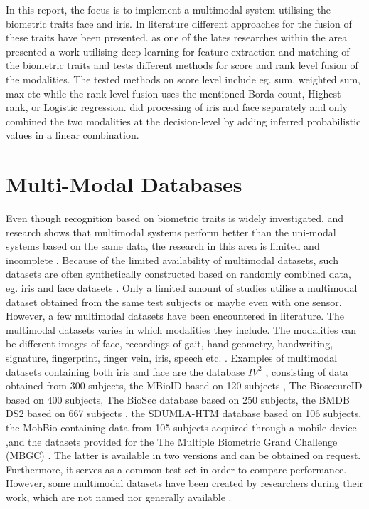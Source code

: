 In this report, the focus is to implement a multimodal system utilising the biometric traits face and iris. In literature different approaches for the fusion of these traits have been presented. \cite{Al-Waisy2017a} as one of the lates researches within the area presented a work utilising deep learning for feature extraction and matching of the biometric traits and tests different methods for score and rank level fusion of the modalities. The tested methods on score level include eg.  sum, weighted sum, max etc while the rank level fusion uses the mentioned Borda count, Highest rank, or Logistic regression. \cite{Chen2005a} did processing of iris and face separately and only combined the two modalities at the decision-level by adding inferred probabilistic values in a linear combination.   

\section{Multi-Modal Databases}
\label{sec:multi_modal_data}
Even though recognition based on biometric traits is widely investigated, and research shows that multimodal systems perform better than the uni-modal systems based on the same data, the research in this area is limited and incomplete \citep{Chen2005a,Bowyer2016b}. Because of the limited availability of multimodal datasets, such datasets are often synthetically constructed based on randomly combined data, eg. iris and face datasets \citep{Chen2005a}. Only a limited amount of studies  utilise a multimodal dataset obtained from the same test subjects or maybe even with one sensor. However, a few multimodal datasets have been encountered in literature. The multimodal datasets varies in which modalities they include. The modalities can be different images of face, recordings of gait, hand geometry, handwriting, signature, fingerprint, finger vein, iris, speech etc. \citep{Yin2011, Dessimoz2007, Ross2003, Ortega-Garcia2010}. Examples of multimodal datasets containing both iris and face are the database $IV^2$ \citep{Petrovska-Delacretaz2008a}, consisting of data obtained from 300 subjects, the MBioID based on 120 subjects \citep{Dessimoz2007}, The BiosecureID based on 400 subjects, The BioSec database based on 250 subjects, the BMDB DS2 based on 667 subjects \citep{Ortega-Garcia2010}, the SDUMLA-HTM database based on 106 subjects, the MobBio containing data from 105 subjects acquired through a mobile device \citep{Sequeira2014},and the datasets provided for the The Multiple Biometric Grand Challenge (MBGC) \citep{Bowyer2016b}. The latter is available in two versions and can be obtained on request. Furthermore, it serves as a common test set in order to compare performance. However, some multimodal datasets have been created by researchers during their work, which are not named nor generally available \citep{Bowyer2016b}. 

